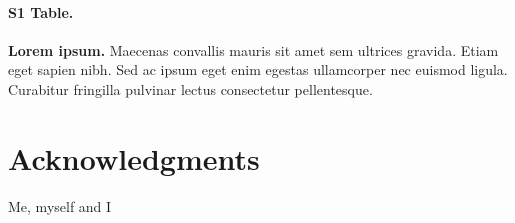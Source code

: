 \documentclass[10pt,letterpaper]{article}
\begin{document}
\paragraph*{S1 Table.}
\label{S1_Table}
{\bf Lorem ipsum.} Maecenas convallis mauris sit amet sem ultrices gravida. Etiam eget sapien nibh. Sed ac ipsum eget enim egestas ullamcorper nec euismod ligula. Curabitur fringilla pulvinar lectus consectetur pellentesque.

\section*{Acknowledgments}
Me, myself and I

\nolinenumbers

%
%
% 
\end{document}
